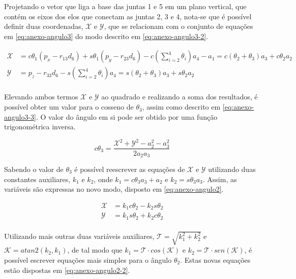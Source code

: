 Projetando o vetor que liga a base das juntas 1 e 5 em um plano vertical, que contém os eixos dos 
elos que conectam as juntas 2, 3 e 4, nota-se que é possível definir duas coordenadas, $\mathcal{X}$
e $\mathcal{Y}$, que se relacionam com o conjunto de equações em \ref{eq:anexo-angulo3} do modo
descrito em \ref{eq:anexo-angulo3-2}.

\begin{align}
    \label{eq:anexo-angulo3-2}
    \mathcal{X} &= c\theta_1(p_x-r_{13}d_6) + s\theta_1(p_y-r_{23}d_6) - c(\sum\limits_{i=2}^4\theta_i)a_4 -a_1 = c(\theta_2+\theta_3)a_3 + c\theta_2a_2\nonumber\\
    \mathcal{Y} &= p_z - r_{33}d_6 - s(\sum\limits_{i=2}^4\theta_i)a_4 = s(\theta_2+\theta_3)a_3 + s\theta_2a_2 \nonumber\\
\end{align}

Elevando ambos termos $\mathcal{X}$ e $\mathcal{Y}$ ao quadrado e realizando a soma dos resultados, 
é possível obter um valor para o cosseno de $\theta_3$, assim como descrito em \ref{eq:anexo-angulo3-3}.
O valor do ângulo em si pode ser obtido por uma função trigonométrica inversa.

\begin{equation}
    \label{eq:anexo-angulo3-3}
    c\theta_3 = \frac{\mathcal{X}^2 + \mathcal{Y}^2 - a_2^2 - a_3^2}{2a_2a_3}
\end{equation}

Sabendo o valor de $\theta_3$ é possível reescrever as equações de $\mathcal{X}$ e $\mathcal{Y}$ utilizando 
duas constantes auxiliares, $k_1$ e $k_2$, onde $k_1=c\theta_3a_3 + a_2$ e $k_2=s\theta_3a_3$. Assim, as 
variáveis são expressas no novo modo, disposto em \ref{eq:anexo-angulo2}.

\begin{align}
    \label{eq:anexo-angulo2}
    \mathcal{X} &= k_1c\theta_2 - k_2s\theta_2 \nonumber\\
    \mathcal{Y} &= k_1s\theta_2 + k_2c\theta_2 \nonumber\\
\end{align}

Utilizando mais outras duas variáveis auxiliares, $\mathcal{T}=\sqrt{k_1^2+k_2^2}$ e $\mathcal{K}=atan2(k_2, k_1)$,
de tal modo que $k_1=\mathcal{T}\cdot cos(\mathcal{K})$ e $k_2=\mathcal{T}\cdot sen(\mathcal{K})$, é 
possível escrever equações mais simples para o ângulo $\theta_2$. Estas novas equações estão dispostas em 
\ref{eq:anexo-angulo2-2}.

